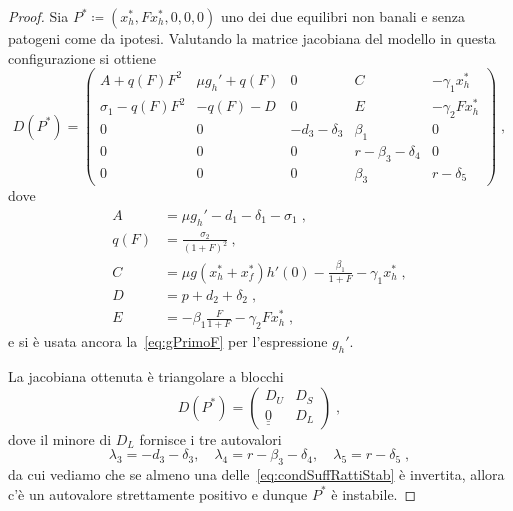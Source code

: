 \begin{proof}
Sia $P^* \coloneq (x_h^*, F x_h^*, 0, 0,0)$ uno dei due equilibri non banali e senza patogeni come da ipotesi.
Valutando la matrice jacobiana del modello in questa configurazione si ottiene
$$D(P^*) =
\begin{pmatrix}
A + q(F) F^2 & \mu g_h' + q(F) & 0 & C & - \gamma_1 x_h^* \\
\sigma_1 -q(F) F^2 & -q(F) -D & 0 & E & - \gamma_2 F x_h^* \\
0 & 0 & -d_3 -\delta_3 & \beta_1 & 0 \\
0 & 0 & 0 & r - \beta_3 -\delta_4 & 0 \\
0 & 0 & 0 & \beta_3 & r -\delta_5
\end{pmatrix} \; ,
$$
dove
\begin{equation}
\begin{split}
A &= \mu g_h' - d_1 -\delta_1 -\sigma_1 \; , \\
q(F) &= \frac{\sigma_2}{(1+F)^2} \: , \\
C &= \mu g(x_h^* + x_f^*) h'(0) - \frac{\beta_1}{1+F} - \gamma_1 x_h^* \; , \\
D &= p + d_2 + \delta_2 \; , \\
E &= -\beta_1 \frac{F}{1+F} -\gamma_2 F x_h^* \; ,
\end{split}
\label{eq:jacoCmpts}
\end{equation}
e si è usata ancora la~\eqref{eq:gPrimoF} per l'espressione $g_h'$.

La jacobiana ottenuta è triangolare a blocchi
$$ D(P^*) =
\begin{pmatrix}
D_U & D_S \\
\underline{\underline{0}} & D_L
\end{pmatrix} \; ,
$$
dove il minore di $D_L$ fornisce i tre autovalori
\begin{equation}
\lambda_3 = -d_3 -\delta_3 , \quad %
\lambda_4 = r -\beta_3 -\delta_4 , \quad
\lambda_5 = r -\delta_5 \; ,
\end{equation}
da cui vediamo che se almeno una delle~\eqref{eq:condSuffRattiStab} è invertita, allora c'è un autovalore
strettamente positivo e dunque $P^*$ è instabile.


\end{proof}
